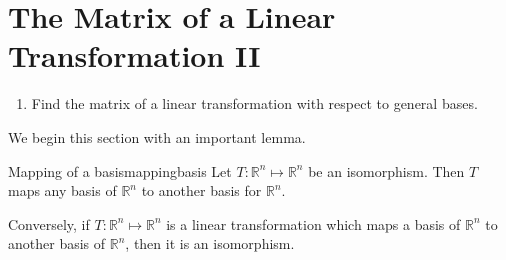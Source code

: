 \section{The Matrix of a Linear Transformation II}


\begin{outcome}

\begin{enumerate}

\item[A.] Find the matrix of a linear transformation with respect to general bases. 

\end{enumerate}
\end{outcome}

We begin this section with an important lemma. 

\begin{lemma}{Mapping of a basis}{mappingbasis}
Let $T: \mathbb{R}^n \mapsto \mathbb{R}^n$ be an isomorphism.  Then $T$ maps any basis of
$\mathbb{R}^n$ to another basis for $\mathbb{R}^n$. 

Conversely, if $T:
\mathbb{R}^n \mapsto \mathbb{R}^n$ is a linear transformation which
maps a basis of $\mathbb{R}^n$ to another basis of $\mathbb{R}^n$,
then it is an isomorphism.
\end{lemma}

